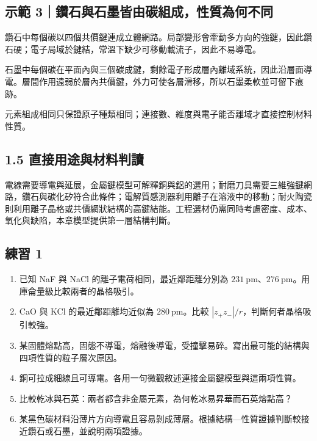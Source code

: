\documentclass[11pt,a4paper]{article}
\providecommand{\tightlist}{%
  \setlength{\itemsep}{0pt}\setlength{\parskip}{0pt}}
\begin{document}
\begin{HandoutWorkedExample}

\subsection{示範 3｜鑽石與石墨皆由碳組成，性質為何不同}\label{ux793aux7bc4-3ux947dux77f3ux8207ux77f3ux58a8ux7686ux7531ux78b3ux7d44ux6210ux6027ux8ceaux70baux4f55ux4e0dux540c}

鑽石中每個碳以四個共價鍵連成立體網路。局部變形會牽動多方向的強鍵，因此鑽石硬；電子局域於鍵結，常溫下缺少可移動載流子，因此不易導電。

石墨中每個碳在平面內與三個碳成鍵，剩餘電子形成層內離域系統，因此沿層面導電。層間作用遠弱於層內共價鍵，外力可使各層滑移，所以石墨柔軟並可留下痕跡。

元素組成相同只保證原子種類相同；連接數、維度與電子能否離域才直接控制材料性質。

\end{HandoutWorkedExample}

\subsection{1.5 直接用途與材料判讀}\label{ux76f4ux63a5ux7528ux9014ux8207ux6750ux6599ux5224ux8b80}

電線需要導電與延展，金屬鍵模型可解釋銅與鋁的選用；耐磨刀具需要三維強鍵網路，鑽石與碳化矽符合此條件；電解質感測器利用離子在溶液中的移動；耐火陶瓷則利用離子晶格或共價網狀結構的高鍵結能。工程選材仍需同時考慮密度、成本、氧化與缺陷，本章模型提供第一層結構判斷。

\subsection{練習 1}\label{ux7df4ux7fd2-1}

\begin{enumerate}
\def\labelenumi{\arabic{enumi}.}
\tightlist
\item
  已知 NaF 與 NaCl 的離子電荷相同，最近鄰距離分別為 \(231\ \mathrm{pm}\)、\(276\ \mathrm{pm}\)。用庫侖量級比較兩者的晶格吸引。
\item
  CaO 與 KCl 的最近鄰距離均近似為 \(280\ \mathrm{pm}\)。比較 \(|z_+z_-|/r\)，判斷何者晶格吸引較強。
\item
  某固體熔點高，固態不導電，熔融後導電，受撞擊易碎。寫出最可能的結構與四項性質的粒子層次原因。
\item
  銅可拉成細線且可導電。各用一句微觀敘述連接金屬鍵模型與這兩項性質。
\item
  比較乾冰與石英：兩者都含非金屬元素，為何乾冰易昇華而石英熔點高？
\item
  某黑色碳材料沿薄片方向導電且容易剝成薄層。根據結構---性質證據判斷較接近鑽石或石墨，並說明兩項證據。
\end{enumerate}
\end{document}
